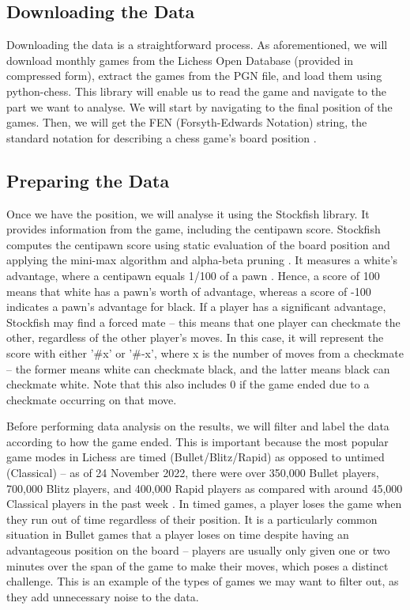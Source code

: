 \documentclass[%
 superscriptaddress,
showpacs,preprintnumbers,
 amsmath,
 amssymb,
 aps,
 pra,
showkeys,
onecolumn,
notitlepage,
11pt,
tightenlines      %
]{revtex4-1}
\begin{document}
\subsection{Downloading the Data}
Downloading the data is a straightforward process. As aforementioned, we will download monthly games from the Lichess Open Database (provided in compressed form), extract the games from the PGN file, and load them using python-chess. This library will enable us to read the game and navigate to the part we want to analyse. We will start by navigating to the final position of the games. Then, we will get the FEN (Forsyth-Edwards Notation) string, the standard notation for describing a chess game's board position \cite{pgnSpecification}. 

\subsection{Preparing the Data}
Once we have the position, we will analyse it using the Stockfish library. It provides information from the game, including the centipawn score. Stockfish computes the centipawn score using static evaluation of the board position and applying the mini-max algorithm and alpha-beta pruning \cite{maharaj2022chess}. It measures a white's advantage, where a centipawn equals 1/100 of a pawn \cite{centipawnDefinition}. Hence, a score of 100 means that white has a pawn's worth of advantage, whereas a score of -100 indicates a pawn's advantage for black. If a player has a significant advantage, Stockfish may find a forced mate -- this means that one player can checkmate the other, regardless of the other player's moves. In this case, it will represent the score with either '\#{x}' or '\#{-x}', where x is the number of moves from a checkmate -- the former means white can checkmate black, and the latter means black can checkmate white. Note that this also includes 0 if the game ended due to a checkmate occurring on that move.

Before performing data analysis on the results, we will filter and label the data according to how the game ended. This is important because the most popular game modes in Lichess are timed (Bullet/Blitz/Rapid) as opposed to untimed (Classical) -- as of 24 November 2022, there were over 350,000 Bullet players, 700,000 Blitz players, and 400,000 Rapid players as compared with around 45,000 Classical players in the past week \cite{lichessBlitzRatingDistribution}. In timed games, a player loses the game when they run out of time regardless of their position. It is a particularly common situation in Bullet games that a player loses on time despite having an advantageous position on the board -- players are usually only given one or two minutes over the span of the game to make their moves, which poses a distinct challenge. This is an example of the types of games we may want to filter out, as they add unnecessary noise to the data.
\end{document}
